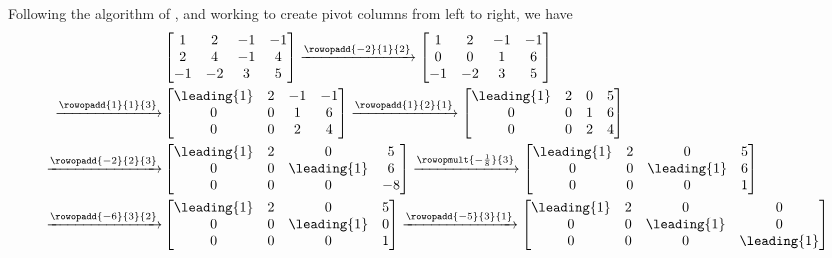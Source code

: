 Following the algorithm of , and working to create pivot columns from left to right, we have
%
\begin{align*}
%
&
\begin{bmatrix}
1 & 2 & -1 & -1 \\
2 & 4 & -1 & 4 \\
-1 & -2 & 3 & 5
\end{bmatrix}
%
\xrightarrow{\rowopadd{-2}{1}{2}}
\begin{bmatrix}
1 & 2 & -1 & -1 \\
0 & 0 & 1 & 6 \\
-1 & -2 & 3 & 5
\end{bmatrix}\\
%
\xrightarrow{\rowopadd{1}{1}{3}}
&
\begin{bmatrix}
\leading{1} & 2 & -1 & -1 \\
0 & 0 & 1 & 6 \\
0 & 0 & 2 & 4
\end{bmatrix}
%
\xrightarrow{\rowopadd{1}{2}{1}}
\begin{bmatrix}
\leading{1} & 2 & 0 & 5 \\
0 & 0 & 1 & 6 \\
0 & 0 & 2 & 4
\end{bmatrix}\\
%
\xrightarrow{\rowopadd{-2}{2}{3}}
&
\begin{bmatrix}
\leading{1} & 2 & 0 & 5 \\
0 & 0 & \leading{1} & 6 \\
0 & 0 & 0 & -8
\end{bmatrix}
\xrightarrow{\rowopmult{-\frac{1}{8}}{3}}
%
\begin{bmatrix}
\leading{1} & 2 & 0 & 5 \\
0 & 0 & \leading{1} & 6 \\
0 & 0 & 0 & 1
\end{bmatrix}\\
%
\xrightarrow{\rowopadd{-6}{3}{2}}
&
\begin{bmatrix}
\leading{1} & 2 & 0 & 5 \\
0 & 0 & \leading{1} & 0 \\
0 & 0 & 0 & 1
\end{bmatrix}
%
\xrightarrow{\rowopadd{-5}{3}{1}}
\begin{bmatrix}
\leading{1} & 2 & 0 & 0 \\
0 & 0 & \leading{1} & 0 \\
0 & 0 & 0 & \leading{1}
\end{bmatrix}
%
\end{align*}
%
